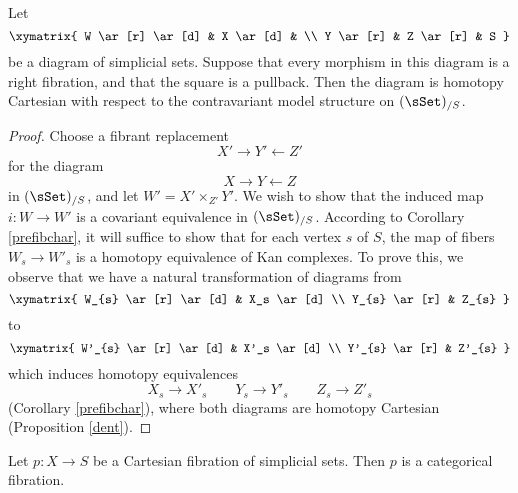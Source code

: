 \begin{corollary}\label{ruy}
Let
$$ \xymatrix{ W \ar[r] \ar[d] & X \ar[d] &  \\
Y \ar[r] & Z \ar[r] & S }$$
be a diagram of simplicial sets. Suppose that every morphism in this diagram is a right fibration, and that the square is a pullback. Then the diagram is homotopy Cartesian with respect to the contravariant model structure on $(\sSet)_{/S}$.
\end{corollary}

\begin{proof}
Choose a fibrant replacement
$$ X' \rightarrow Y' \leftarrow Z'$$
for the diagram
$$ X \rightarrow Y \leftarrow Z$$
in $(\sSet)_{/S}$, and let $W' = X' \times_{Z'} Y'$. We wish to show that the induced map
$i: W \rightarrow W'$ is a covariant equivalence in $(\sSet)_{/S}$. According to Corollary \ref{prefibchar}, it will suffice to show that for each vertex $s$ of $S$, the map of fibers
$W_{s} \rightarrow W'_{s}$ is a homotopy equivalence of Kan complexes. 
To prove this, we observe that we have a natural transformation of diagrams from
$$ \xymatrix{ W_{s} \ar[r] \ar[d] & X_s \ar[d] \\
Y_{s} \ar[r] & Z_{s} }$$
to
$$ \xymatrix{ W'_{s} \ar[r] \ar[d] & X'_s \ar[d] \\
Y'_{s} \ar[r] & Z'_{s} }$$
which induces homotopy equivalences 
$$X_{s} \rightarrow X'_{s} \quad \quad Y_{s} \rightarrow Y'_{s} \quad \quad Z_{s} \rightarrow Z'_{s}$$ 
(Corollary \ref{prefibchar}), where both diagrams are homotopy Cartesian (Proposition \ref{dent}).
\end{proof}

\begin{proposition}\label{funkyfibcatfib}
Let $p: X \rightarrow S$ be a Cartesian fibration of simplicial sets. Then $p$ is a categorical fibration.
\end{proposition}

